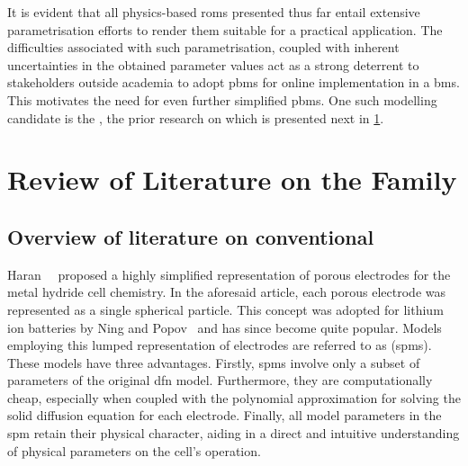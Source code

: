 
\pagebreak

It  is evident  that all  physics-based  \glspl{rom} presented  thus far  entail
extensive  parametrisation  efforts to  render  them  suitable for  a  practical
application. The difficulties associated with such parametrisation, coupled with
inherent  uncertainties  in  the  obtained  parameter values  act  as  a  strong
deterrent  to stakeholders  outside  academia to  adopt  \glspl{pbm} for  online
implementation  in  a  \gls{bms}.  This  motivates the  need  for  even  further
simplified \glspl{pbm}. One such modelling  candidate is the , the
prior research on which is presented next in \cref{sec:spmlittreview}.


\section{Review of Literature on the  Family}\label{sec:spmlittreview}

\subsection{Overview of literature on conventional }

Haran~\etal{}~\cite{Haran1998}  proposed a  highly simplified  representation of
porous  electrodes  for the  metal  hydride  cell  chemistry. In  the  aforesaid
article,  each   porous  electrode  was   represented  as  a   single  spherical
particle.  This concept  was  adopted  for lithium  ion  batteries  by Ning  and
Popov~\cite{Ning2004} and has since become  quite popular. Models employing this
lumped  representation  of  electrodes  are referred  to  as  
(\glspl{spm}).  These models  have  three advantages.  Firstly,  \glspl{spm}
involve  only a  subset  of  parameters  of  the   original  \gls{dfn}  model.
Furthermore,  they are  computationally cheap, especially when coupled with the 
polynomial approximation for solving the solid diffusion  equation for  each
electrode.  Finally, all  model parameters  in the \gls{spm}  retain their 
physical character,  aiding in  a direct  and intuitive understanding of
physical parameters on the cell's operation.

